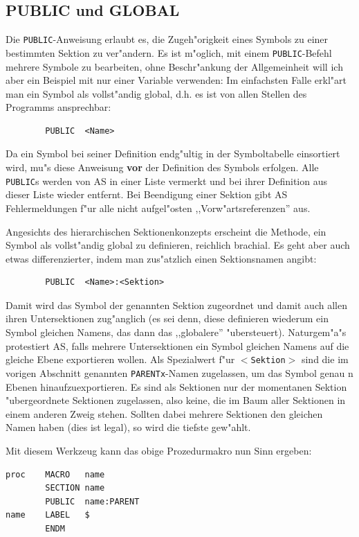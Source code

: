 \documentclass[12pt,a4paper,twoside]{report}
\newcommand{\bb}[1]{{\bf #1}}
\newcommand{\tty}[1]{{\tt #1}}
\newcommand{\asname}{AS}
\begin{document}
\subsection{PUBLIC und GLOBAL}

Die \tty{PUBLIC}-Anweisung erlaubt es, die Zugeh"origkeit eines Symbols
zu einer bestimmten Sektion zu ver"andern.  Es ist m"oglich, mit einem
\tty{PUBLIC}-Befehl mehrere Symbole zu bearbeiten, ohne Beschr"ankung
der Allgemeinheit will ich aber ein Beispiel mit nur einer Variable verwenden:
Im einfachsten Falle erkl"art man ein Symbol als vollst"andig global, d.h.
es ist von allen Stellen des Programms ansprechbar:
\begin{verbatim}
        PUBLIC  <Name>
\end{verbatim}
Da ein Symbol bei seiner Definition endg"ultig in der Symboltabelle
einsortiert wird, mu"s diese Anweisung \bb{vor} der Definition des
Symbols erfolgen.  Alle \tty{PUBLIC}s werden von \asname{} in einer Liste
vermerkt und bei ihrer Definition aus dieser Liste wieder entfernt.  Bei
Beendigung einer Sektion gibt \asname{} Fehlermeldungen f"ur alle nicht
aufgel"osten ,,Vorw"artsreferenzen'' aus.
\par
Angesichts des hierarchischen Sektionenkonzepts erscheint die Methode,
ein Symbol als vollst"andig global zu definieren, reichlich brachial.
Es geht aber auch etwas differenzierter, indem man zus"atzlich einen
Sektionsnamen angibt:
\begin{verbatim}
        PUBLIC  <Name>:<Sektion>
\end{verbatim}
Damit wird das Symbol der genannten Sektion zugeordnet und damit auch
allen ihren Untersektionen zug"anglich (es sei denn, diese definieren
wiederum ein Symbol gleichen Namens, das dann das ,,globalere''
"ubersteuert).  Naturgem"a"s protestiert \asname{}, falls mehrere Untersektionen
ein Symbol gleichen Namens auf die gleiche Ebene exportieren wollen.
Als Spezialwert f"ur \tty{$<$Sektion$>$} sind die im vorigen Abschnitt
genannten \tty{PARENTx}-Namen zugelassen, um das Symbol genau n Ebenen hinaufzuexportieren.
Es sind als Sektionen nur der momentanen Sektion "ubergeordnete Sektionen
zugelassen, also keine, die im Baum aller Sektionen in einem anderen Zweig
stehen.  Sollten dabei mehrere Sektionen den gleichen Namen haben (dies ist
legal), so wird die tiefste gew"ahlt.
\par
Mit diesem Werkzeug kann das obige Prozedurmakro nun Sinn ergeben:
\begin{verbatim}
proc    MACRO   name
        SECTION name
        PUBLIC  name:PARENT
name    LABEL   $
        ENDM
\end{verbatim}
\end{document}
